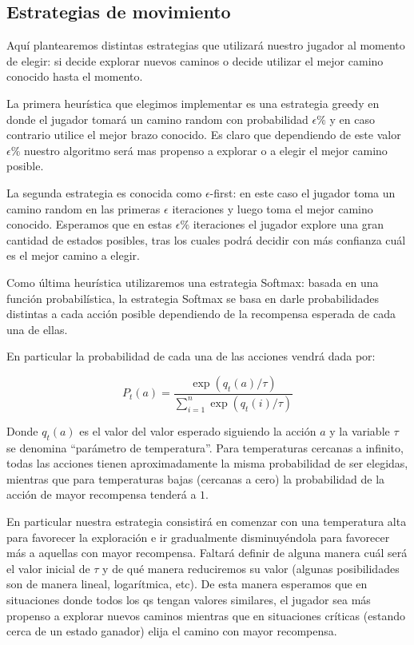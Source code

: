\subsection{Estrategias de movimiento}

Aquí plantearemos distintas estrategias que utilizará nuestro jugador al momento de elegir: si decide explorar nuevos caminos o decide utilizar el mejor camino conocido hasta el momento.

La primera heurística que elegimos implementar es una estrategia greedy en donde el jugador tomará un camino random con probabilidad $\epsilon\%$ y en caso contrario utilice el mejor brazo conocido. Es claro que dependiendo de este valor $\epsilon\%$ nuestro algoritmo será mas propenso a explorar o a elegir el mejor camino posible.

La segunda estrategia es conocida como $\epsilon$-first: en este caso el jugador toma un camino random en las primeras $\epsilon$ iteraciones y luego toma el mejor camino conocido. Esperamos que en estas $\epsilon\%$ iteraciones el jugador explore una gran cantidad de estados posibles, tras los cuales podrá decidir con más confianza cuál es el mejor camino a elegir.

Como última heurística utilizaremos una estrategia Softmax: basada en una función probabilística, la estrategia Softmax se basa en darle probabilidades distintas a cada acción posible dependiendo de la recompensa esperada de cada una de ellas.

En particular la probabilidad de cada una de las acciones vendrá dada por:

$$P_t(a) = \frac{\exp(q_t(a)/\tau)}{\sum_{i=1}^n\exp(q_t(i)/\tau)}$$

Donde $q_t(a)$ es el valor del valor esperado siguiendo la acción $a$ y la variable $\tau$ se denomina ``parámetro de temperatura''. Para temperaturas cercanas a infinito, todas las acciones tienen aproximadamente la misma probabilidad de ser elegidas, mientras que para temperaturas bajas (cercanas a cero) la probabilidad de la acción de mayor recompensa tenderá a $1$.

En particular nuestra estrategia consistirá en comenzar con una temperatura alta para favorecer la exploración e ir gradualmente disminuyéndola para favorecer más a aquellas con mayor recompensa. Faltará definir de alguna manera cuál será el valor inicial de $\tau$ y de qué manera reduciremos su valor (algunas posibilidades son de manera lineal, logarítmica, etc). De esta manera esperamos que en situaciones donde todos los qs tengan valores similares, el jugador sea más propenso a explorar nuevos caminos mientras que en situaciones críticas (estando cerca de un estado ganador) elija el camino con mayor recompensa.

